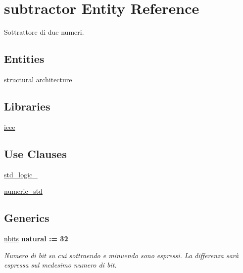 \hypertarget{classsubtractor}{\section{subtractor Entity Reference}
\label{classsubtractor}
}


Sottrattore di due numeri.  


\subsection*{Entities}
\begin{DoxyCompactItemize}
\item 
\hyperlink{classsubtractor_1_1structural}{structural} architecture
\end{DoxyCompactItemize}
\subsection*{Libraries}
 \begin{DoxyCompactItemize}
\item 
\hyperlink{group___subtractor_ga0a6af6eef40212dbaf130d57ce711256}{ieee} 
\end{DoxyCompactItemize}
\subsection*{Use Clauses}
 \begin{DoxyCompactItemize}
\item 
\hyperlink{group___subtractor_gacd03516902501cd1c7296a98e22c6fcb}{std\+\_\+logic\+\_}   
\item 
\hyperlink{group___subtractor_ga2edc34402b573437d5f25fa90ba4013e}{numeric\+\_\+std}   
\end{DoxyCompactItemize}
\subsection*{Generics}
 \begin{DoxyCompactItemize}
\item 
\hyperlink{group___subtractor_gae1435c07d0cd54b521535e2f8de6f94e}{nbits} {\bfseries {\bfseries \textcolor{vhdlchar}{natural}\textcolor{vhdlchar}{ }\textcolor{vhdlchar}{ }\textcolor{vhdlchar}{\+:}\textcolor{vhdlchar}{=}\textcolor{vhdlchar}{ }\textcolor{vhdlchar}{ } \textcolor{vhdldigit}{32} \textcolor{vhdlchar}{ }}}
\begin{DoxyCompactList}\small\item\em Numero di bit su cui sottraendo e minuendo sono espressi. La differenza sarà espressa sul medesimo numero di bit. \end{DoxyCompactList}\end{DoxyCompactItemize}
